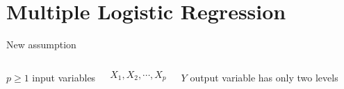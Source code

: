 \documentclass[aspectratio=169,dvipsnames]{beamer}
\begin{document}


\section{Multiple Logistic Regression}

\begin{frame}[c]{New assumption}
\begin{columns}
\centering
	$p\geq 1$ input variables 

	$$ 
	X_1,X_2,\cdots, X_p
	$$

\centering
$Y$ output variable has only two levels 
\end{columns}
\end{frame}
\end{document}
